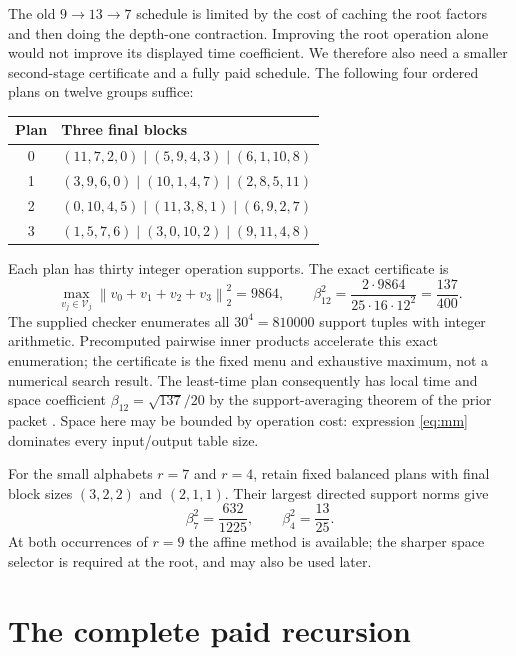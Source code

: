 \documentclass[11pt]{article}
\theoremstyle{definition}\newtheorem{definition}[theorem]{Definition}
\theoremstyle{remark}\newtheorem{remark}[theorem]{Remark}
\newcommand{\norm}[1]{\left\lVert#1\right\rVert_2}
\begin{document}
The old $9\to13\to7$ schedule is limited by the cost of caching the
root factors and then doing the depth-one contraction. Improving the
root operation alone would not improve its displayed time coefficient.
We therefore also need a smaller second-stage certificate and a fully
paid schedule. The following four ordered plans on twelve groups suffice:
\begin{center}\small
\begin{tabular}{cl}
\toprule Plan & Three final blocks\\\midrule
0 & $(11,7,2,0)\mid(5,9,4,3)\mid(6,1,10,8)$\\
1 & $(3,9,6,0)\mid(10,1,4,7)\mid(2,8,5,11)$\\
2 & $(0,10,4,5)\mid(11,3,8,1)\mid(6,9,2,7)$\\
3 & $(1,5,7,6)\mid(3,0,10,2)\mid(9,11,4,8)$\\
\bottomrule
\end{tabular}
\end{center}
Each plan has thirty integer operation supports. The exact certificate is
\begin{equation}\label{eq:twelveQ}
 \max_{v_j\in\mathcal V_j}
   \norm{v_0+v_1+v_2+v_3}^2=9864,
 \qquad
 \beta_{12}^2=\frac{2\cdot9864}{25\cdot16\cdot12^2}
             =\frac{137}{400}.
\end{equation}
The supplied checker enumerates all $30^4=810000$ support tuples with
integer arithmetic. Precomputed pairwise inner products accelerate this
exact enumeration; the certificate is the fixed menu and exhaustive
maximum, not a numerical search result. The least-time plan consequently
has local time and space coefficient $\beta_{12}=\sqrt{137}/20$ by the
support-averaging theorem of the prior packet \cite{trees}. Space here may
be bounded by operation cost: expression \eqref{eq:mm} dominates every
input/output table size.

For the small alphabets $r=7$ and $r=4$, retain fixed balanced plans with
final block sizes $(3,2,2)$ and $(2,1,1)$. Their largest directed support
norms give
\begin{equation}\label{eq:smallbetas}
 \beta_7^2=\frac{632}{1225},\qquad \beta_4^2=\frac{13}{25}.
\end{equation}
At both occurrences of $r=9$ the affine method is available; the sharper
space selector is required at the root, and may also be used later.

\section{The complete paid recursion}
\label{sec:global}
\end{document}
